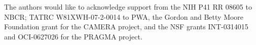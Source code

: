 \documentclass[conference]{IEEEtran}
\begin{document}
The authors would like to acknowledge support from the NIH P41 RR 08605 to
NBCR; TATRC W81XWH-07-2-0014 to PWA, the Gordon and Betty Moore Foundation
grant for the CAMERA project, and the NSF grants INT-0314015 and
OCI-0627026 for the PRAGMA project. 




\end{document}
